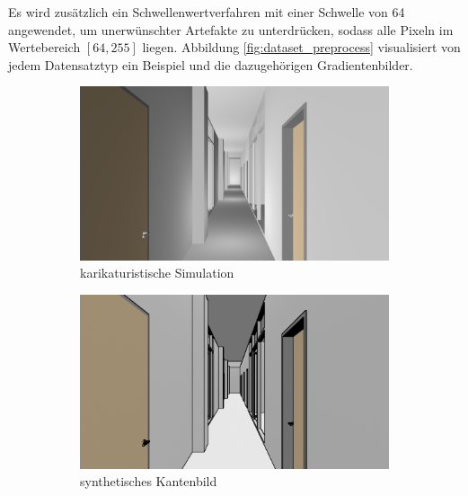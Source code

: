 Es wird zusätzlich ein Schwellenwertverfahren mit einer Schwelle von 64 angewendet, um unerwünschter Artefakte zu unterdrücken, sodass alle Pixeln im Wertebereich $[64, 255]$ liegen. Abbildung \ref{fig:dataset_preprocess} visualisiert von jedem Datensatztyp ein Beispiel und die dazugehörigen Gradientenbilder.
\vspace{1cm}
\begin{figure}[H]
	\centering
	\begin{subfigure}[t]{0.24\linewidth}
		\centering
		\includegraphics[width=\linewidth]{images/syn_dataset/b00708.png}
		\caption{karikaturistische Simulation}
		\label{subfig:cartoonish}
	\end{subfigure}
	\hfill
	\begin{subfigure}[t]{0.24\linewidth}
		\centering
		\includegraphics[width=\linewidth]{images/syn_dataset/e00708.png}
		\caption{synthetisches \hspace{1cm} Kantenbild}
		\label{subfig:edge}
	\end{subfigure}
	\hfill
	\begin{subfigure}[t]{0.24\linewidth}
		\centering

\end{subfigure}
\end{figure}
